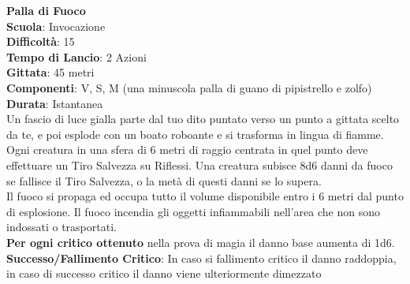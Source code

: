 \begin{multicols}{2}
\medskip\textbf{Palla di Fuoco}\\
\textbf{Scuola}: Invocazione\\
\textbf{Difficoltà}:  15\\
\textbf{Tempo di Lancio}: 2 Azioni\\
\textbf{Gittata}: 45 metri\\
\textbf{Componenti}: V, S, M (una minuscola palla di guano di pipistrello e zolfo)\\
\textbf{Durata}: Istantanea\\
Un fascio di luce gialla parte dal tuo dito puntato verso un punto a gittata scelto da te, e poi esplode con un boato roboante e si trasforma in lingua di fiamme.\\
Ogni creatura in una sfera di 6 metri di raggio centrata in quel punto deve effettuare un Tiro Salvezza su Riflessi. Una creatura subisce 8d6 danni da fuoco se fallisce il Tiro Salvezza, o la metà di questi danni se lo supera.\\
Il fuoco si propaga ed occupa tutto il volume disponibile entro i 6 metri dal punto di esplosione. Il fuoco incendia gli oggetti infiammabili nell'area che non sono indossati o trasportati.\\
\textbf{Per ogni critico ottenuto} nella prova di magia il danno base aumenta di 1d6.\\
\textbf{Successo/Fallimento Critico}: In caso si fallimento critico il danno raddoppia, in caso di successo critico il danno viene ulteriormente dimezzato


\end{multicols}
